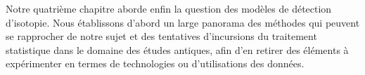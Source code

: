 Notre quatrième chapitre aborde enfin la question des modèles de détection d'isotopie. Nous établissons d'abord un large panorama des méthodes qui peuvent se rapprocher de notre sujet et des tentatives d'incursions du traitement statistique dans le domaine des études antiques, afin d'en retirer des éléments à expérimenter en termes de technologies ou d'utilisations des données.


% 

